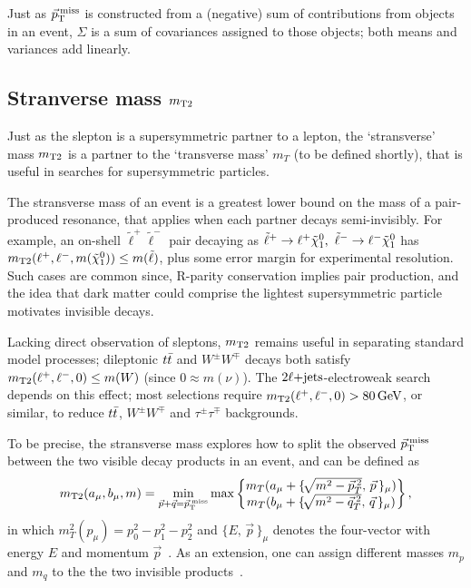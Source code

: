 Just as $\ptmiss$ is constructed from a (negative) sum of contributions from
objects in an event,
$\Sigma$ is a sum of covariances assigned to those objects;
both means and variances add linearly.


\subsection{Stranverse mass $\mttwo$}
\label{sec:2ljets_mt2}
Just as the slepton is a supersymmetric partner to a lepton, the `stransverse'
mass  $\mttwo$ is a partner to the `transverse mass' $m_T$
(to be defined shortly),
that is useful in searches for supersymmetric particles.

The stransverse mass of an event is a greatest lower bound on the mass of a
pair-produced resonance, that applies when each partner decays semi-invisibly.
For example, an on-shell $\tilde\ell^+\tilde\ell^-$ pair decaying as
$\tilde\ell^+ \rightarrow \ell^+ \neutralino_1
,~
\tilde\ell^- \rightarrow \ell^- \neutralino_1$ has
$\mttwo(\ell^+, \ell^-, m(\neutralino_1)) \leq m(\tilde\ell)$, plus some error
margin for experimental resolution.
Such cases are common since, R-parity conservation implies pair production,
and the idea that dark matter could comprise the lightest supersymmetric
particle motivates invisible decays.

Lacking direct observation of sleptons, $\mttwo$ remains useful in separating
standard model processes; dileptonic $\ttbar$ and $W^\pm W^\mp$ decays both
satisfy $\mttwo(\ell^+, \ell^-, 0) \leq m(W)$ (since $0 \approx m(\nu)$).
The $\twoljets$-electroweak search depends on this effect;
most selections require $\mttwo(\ell^+, \ell^-, 0) > 80\,\eV[G]$, or similar,
to reduce $\ttbar$, $W^\pm W^\mp$ and $\tau^\pm\tau^\mp$ backgrounds.

To be precise, the stransverse mass explores how to split the observed
$\ptmiss$ between the two visible decay products in an event, and can be
defined as
\begin{equation}
\mttwo(a_\mu, b_\mu, m)
=
\min_{\vec p + \vec q=\ptmiss}
\max
\begin{Bmatrix}
m_T(a_\mu + \{\!\sqrt{m^2 - \vec p_T^{\:2}},\,\vec p\,\}_\mu)\\
m_T(b_\mu + \{\!\sqrt{m^2 - \vec q_T^{\:2}},\,\vec q\,\}_\mu)\\
\end{Bmatrix}
,
\end{equation}
in which $m_T^2(p_\mu) = p_0^2 - p_1^2 - p_2^2$ and $\{E,\,\vec p\,\}_\mu$ denotes
the four-vector with energy $E$ and momentum $\vec p$~\cite{lester1999measuring}.
As an extension, one can assign different masses $m_p$ and $m_q$ to the
the two invisible products~\cite{lester2015bisection}.

